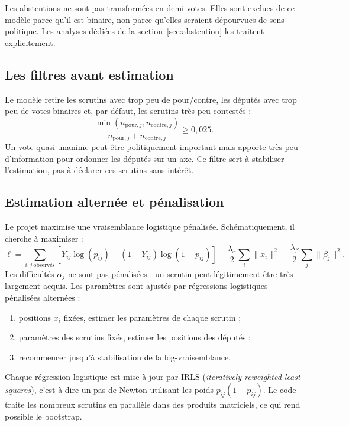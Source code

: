 \documentclass[11pt,a4paper]{article}
\begin{document}
Les abstentions ne sont pas transformées en demi-votes. Elles sont exclues de
ce modèle parce qu'il est binaire, non parce qu'elles seraient dépourvues de
sens politique. Les analyses dédiées de la section~\ref{sec:abstention} les
traitent explicitement.

\subsection{Les filtres avant estimation}

Le modèle retire les scrutins avec trop peu de pour/contre, les députés avec
trop peu de votes binaires et, par défaut, les scrutins très peu contestés :
\[
 \frac{\min(n_{\mathrm{pour},j},n_{\mathrm{contre},j})}
 {n_{\mathrm{pour},j}+n_{\mathrm{contre},j}}\geq0{,}025.
\]
Un vote quasi unanime peut être politiquement important mais apporte très peu
d'information pour ordonner les députés sur un axe. Ce filtre sert à stabiliser
l'estimation, pas à déclarer ces scrutins sans intérêt.

\subsection{Estimation alternée et pénalisation}

Le projet maximise une vraisemblance logistique pénalisée. Schématiquement, il
cherche à maximiser :
\[
 \ell=\sum_{i,j\ \mathrm{observés}}
 \left[Y_{ij}\log(p_{ij})+(1-Y_{ij})\log(1-p_{ij})\right]
 -\frac{\lambda_x}{2}\sum_i\|x_i\|^2
 -\frac{\lambda_\beta}{2}\sum_j\|\beta_j\|^2.
\]
Les difficultés $\alpha_j$ ne sont pas pénalisées : un scrutin peut
légitimement être très largement acquis. Les paramètres sont ajustés par
régressions logistiques pénalisées alternées :

\begin{enumerate}
  \item positions $x_i$ fixées, estimer les paramètres de chaque scrutin ;
  \item paramètres des scrutins fixés, estimer les positions des députés ;
  \item recommencer jusqu'à stabilisation de la log-vraisemblance.
\end{enumerate}

Chaque régression logistique est mise à jour par IRLS (\emph{iteratively
reweighted least squares}), c'est-à-dire un pas de Newton utilisant les poids
$p_{ij}(1-p_{ij})$. Le code traite les nombreux scrutins en parallèle dans des
produits matriciels, ce qui rend possible le bootstrap.
\end{document}
